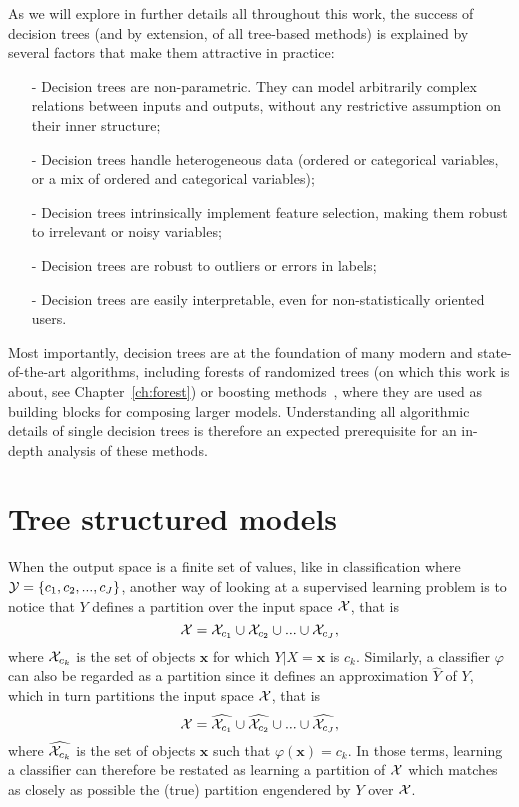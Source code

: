 As we will explore in further details all throughout this work, the success
of decision trees (and by extension, of all tree-based methods) is explained
by several factors that make them attractive in practice:
\begin{itemize}
\item[-] Decision trees are non-parametric. They can model arbitrarily complex relations between inputs and outputs, without any restrictive assumption on their inner structure;
\item[-] Decision trees handle heterogeneous data (ordered or categorical variables, or a mix of ordered and categorical variables);
\item[-] Decision trees intrinsically implement feature selection, making them robust to irrelevant or noisy variables;
\item[-] Decision trees are robust to outliers or errors in labels;
\item[-] Decision trees are easily interpretable, even for non-statistically oriented users.
\end{itemize}

Most importantly, decision trees are at the foundation of
many modern and state-of-the-art algorithms, including forests of randomized
trees (on which this work is about, see Chapter~\ref{ch:forest}) or
boosting methods~\citep{freund:1995,friedman:2001}, where they are used
as building blocks for composing larger models. Understanding all algorithmic
details of single decision trees is therefore an expected prerequisite
for an in-depth analysis of these methods.


\section{Tree structured models}
\label{sec:3:tree-structured-models}

When the output space is a finite set of values, like in classification where
${\cal Y} = \{c_1, c_2, ..., c_J\}$, another way of looking at a supervised
learning problem is to notice that $Y$ defines a partition over the input space
${\cal X}$, that is $${\cal X} = {\cal X}_{c_1} \cup {\cal X}_{c_2} \cup ...
\cup {\cal X}_{c_J},$$ where ${\cal X}_{c_k}$ is the set of objects
$\mathbf{x}$ for which $Y|X=\mathbf{x}$ is $c_k$. Similarly, a classifier
$\varphi$ can also be regarded as a partition since it defines an
approximation $\widehat{Y}$ of $Y$, which in turn partitions the
input space ${\cal X}$, that is $${\cal X} = \widehat{{\cal X}_{c_1}} \cup
\widehat{{\cal X}_{c_2}} \cup ... \cup \widehat{{\cal X}_{c_J}},$$ where
$\widehat{{\cal X}_{c_k}}$ is the set of objects $\mathbf{x}$ such that
$\varphi(\mathbf{x}) = c_k$. In those terms, learning a classifier can
therefore be restated as learning a partition of ${\cal X}$ which matches as
closely as possible the (true) partition engendered by $Y$ over ${\cal X}$.

